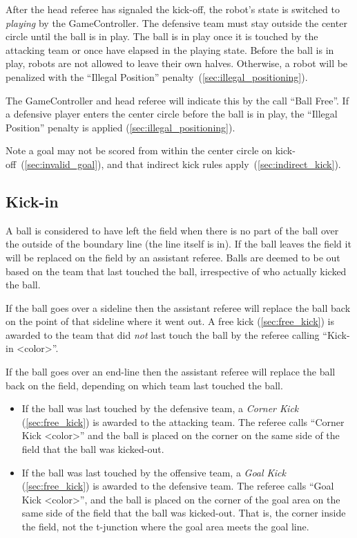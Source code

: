 After the head referee has signaled the kick-off, the robot's state is switched to \emph{playing} by the GameController.
The defensive team must stay outside the center circle until the ball is in play. The ball is in play once it is touched by the attacking team or once \emph{\KickOffBallFreeTime} have elapsed in the playing state. Before the ball is in play, robots are not allowed to leave their own halves. Otherwise, a robot will be penalized with the ``Illegal Position'' penalty~(\cf \cref{sec:illegal_positioning}).

The GameController and head referee will indicate this by the call ``Ball Free''.
If a defensive player enters the center circle before the ball is in play, the ``Illegal Position'' penalty is applied (\cf \cref{sec:illegal_positioning}).

Note a goal may not be scored from within the center circle on kick-off~(\cf \cref{sec:invalid_goal}), and that indirect kick rules apply~(\cf \cref{sec:indirect_kick}).

\subsection{Kick-in}
\label{sec:kick_in}

A ball is considered to have left the field when there is no part of the ball over the outside of the boundary line (\ie the line itself is in). If the ball leaves the field it will be replaced on the field by an assistant referee. Balls are deemed to be out based on the team that last touched the ball, irrespective of who actually kicked the ball.

If the ball goes over a sideline then the assistant referee will replace the ball back on the point of that sideline where it went out. A free kick (\cf \cref{sec:free_kick}) is awarded to the team that did \emph{not} last touch the ball by the referee calling ``Kick-in \textless color\textgreater''.

If the ball goes over an end-line then the assistant referee will replace the ball back on the field, depending on which team last touched the ball.

\begin{itemize}
  \item If the ball was last touched by the defensive team, a \emph{Corner Kick} (\cf \cref{sec:free_kick}) is awarded to the attacking team. The referee calls ``Corner Kick \textless color\textgreater'' and the ball is placed on the corner on the same side of the field that the ball was kicked-out.
  \item If the ball was last touched by the offensive team, a \emph{Goal Kick} (\cf \cref{sec:free_kick}) is awarded to the defensive team. The referee calls ``Goal Kick \textless color\textgreater'', and the ball is placed on the corner of the goal area on the same side of the field that the ball was kicked-out. That is, the corner inside the field, not the t-junction where the goal area meets the goal line.
\end{itemize}

